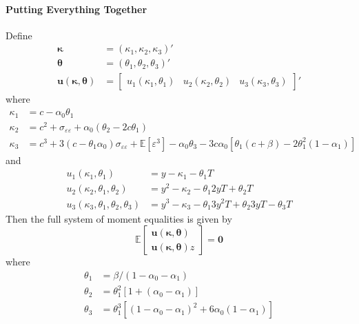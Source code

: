 \documentclass[12pt]{article}
\begin{document}
\paragraph{Putting Everything Together} Define
\begin{align*}
\boldsymbol{\kappa} &= (\kappa_1, \kappa_2, \kappa_3)' \\
\boldsymbol{\theta} &= (\theta_1, \theta_2, \theta_3)'\\
\mathbf{u}(\boldsymbol{\kappa}, \boldsymbol{\theta}) &= 
\left[
\begin{array}{ccc}
  u_1(\kappa_1, \theta_1) & 
  u_2(\kappa_2, \theta_2) &
  u_3(\kappa_3, \theta_3)
\end{array}
\right]'
\end{align*}
where
\begin{align*}
\kappa_1 &= c - \alpha_0 \theta_1\\
  \kappa_2 &= c^2 + \sigma_{\varepsilon\varepsilon} + \alpha_0 (\theta_2 - 2c \theta_1)\\
  \kappa_3 &= c^3 + 3\left( c - \theta_1 \alpha_0 \right) \sigma_{\varepsilon\varepsilon} + \mathbb{E}[\varepsilon^3] - \alpha_0 \theta_3 - 3 c \alpha_0 \left[ \theta_1 \left( c + \beta \right) - 2\theta_1^2 (1 - \alpha_1) \right]
\end{align*}
and
\begin{align*}
u_1(\kappa_1, \theta_1) &= y - \kappa_1 - \theta_1 T\\
  u_2(\kappa_2, \theta_1, \theta_2) &= y^2 - \kappa_2 - \theta_1 2 yT + \theta_2 T\\
  u_3(\kappa_3, \theta_1, \theta_2, \theta_3) &= y^3 - \kappa_3 - \theta_1 3y^2 T + \theta_2 3yT - \theta_3 T
\end{align*}
Then the full system of moment equalities is given by
\[
  \mathbb{E}\left[
  \begin{array}{l}
    \mathbf{u}\left( \boldsymbol{\kappa}, \boldsymbol{\theta} \right)\\
    \mathbf{u}\left( \boldsymbol{\kappa}, \boldsymbol{\theta} \right)z
  \end{array}
\right] = \mathbf{0}
\]
where
\begin{align*}
  \theta_1 &= \beta/(1 - \alpha_0 - \alpha_1)\\
  \theta_2 &= \theta_1^2 \left[ 1 + (\alpha_0 - \alpha_1) \right]\\
  \theta_3 &= \theta_1^3\left[ \left( 1 - \alpha_0 - \alpha_1 \right)^2 + 6\alpha_0\left( 1 - \alpha_1 \right) \right]
\end{align*}
\end{document}
